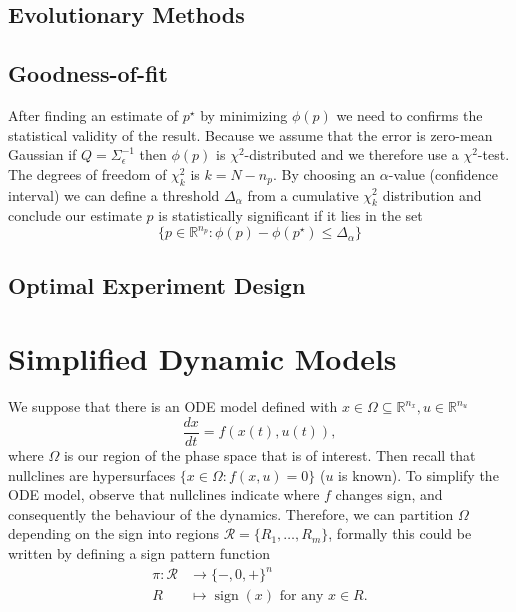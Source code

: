 \documentclass[a4paper]{article}
\DeclareMathOperator{\sign}{sign}
\theoremstyle{plain}
\theoremstyle{definition}
\theoremstyle{remark}
\begin{document}
\subsection{Evolutionary Methods}


\subsection{Goodness-of-fit}

After finding an estimate of $p^\star$ by minimizing $\phi(p)$ we need to
confirms the statistical validity of the result. Because we assume that the
error is zero-mean Gaussian if $Q = \Sigma_\epsilon^{-1}$ then $\phi(p)$ is
$\chi^2$-distributed and we therefore use a $\chi^2$-test. The degrees of
freedom of $\chi^2_k$ is $k = N - n_p$. By choosing an $\alpha$-value
(confidence interval) we can define a threshold $\Delta_\alpha$ from a
cumulative $\chi_k^2$ distribution and conclude our estimate $p$ is
statistically significant if it lies in the set
\[
  \{ p \in \mathbb{R}^{n_p} : \phi(p) - \phi(p^\star) \leq \Delta_\alpha \}
\]

\subsection{Optimal Experiment Design}


\section{Simplified Dynamic Models}

We suppose that there is an ODE model defined with $x \in \Omega \subseteq
\mathbb{R}^{n_x}, u \in \mathbb{R}^{n_u}$
\[
  \frac{dx}{dt} = f(x(t), u(t)),
\]
where $\Omega$ is our region of the phase space that is of interest. Then
recall that nullclines are hypersurfaces $\{x \in \Omega : f(x, u) = 0\}$ ($u$
is known). To simplify the ODE model, observe that nullclines indicate where
$f$ changes sign, and consequently the behaviour of the dynamics. Therefore,
we can partition $\Omega$ depending on the sign into regions $\mathcal{R} =
\{R_1, \ldots, R_m\}$, formally this could be written by defining a sign
pattern function
\begin{align*}
  \pi: \mathcal{R} &\to \{-,0,+\}^n \\
    R &\mapsto \sign(x) \text{ for any } x \in R.
\end{align*}
\end{document}
